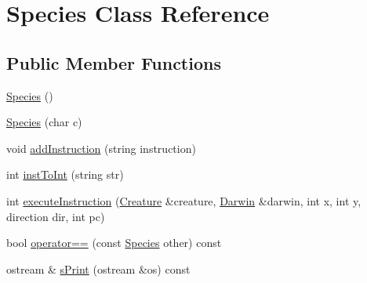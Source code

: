 \hypertarget{classSpecies}{\section{Species Class Reference}
\label{classSpecies}
}
\subsection*{Public Member Functions}
\begin{DoxyCompactItemize}
\item 
\hyperlink{classSpecies_abb0f8e3208b0cc676157b7dff837c0be}{Species} ()
\item 
\hyperlink{classSpecies_a59688d2665117dfd56dddc550e91ff84}{Species} (char c)
\item 
void \hyperlink{classSpecies_a6b1195ac05cdf7da5ea5f495720da7a5}{add\-Instruction} (string instruction)
\item 
int \hyperlink{classSpecies_a17bbcac6e94c3345cd9da4ccc960720e}{inst\-To\-Int} (string str)
\item 
int \hyperlink{classSpecies_aaeb8631ae4a285d785886d1de444adc0}{execute\-Instruction} (\hyperlink{classCreature}{Creature} \&creature, \hyperlink{classDarwin}{Darwin} \&darwin, int x, int y, direction dir, int pc)
\item 
bool \hyperlink{classSpecies_a60c866ccb25ee44f7327c2a0ee410a96}{operator==} (const \hyperlink{classSpecies}{Species} other) const 
\item 
ostream \& \hyperlink{classSpecies_a4dfc1d284aa436f8a51284464b55ac29}{s\-Print} (ostream \&os) const 
\end{DoxyCompactItemize}


